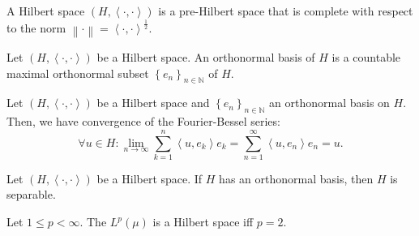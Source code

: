 \begin{frame}
	\begin{definition}
		A \alert{Hilbert space}
		\begin{math}
			\left(
			H,
			\left\langle\cdot,\cdot\right\rangle
			\right)
		\end{math}
		is a pre-Hilbert space that is complete with respect to the norm
		\begin{math}
			\left\|\cdot\right\|=
			{\left\langle\cdot,\cdot\right\rangle}^{\frac{1}{2}}
		\end{math}.
	\end{definition}

	\begin{definition}
		Let
		\begin{math}
			\left(
			H,
			\left\langle\cdot,\cdot\right\rangle
			\right)
		\end{math}
		be a Hilbert space.
		An \alert{orthonormal basis} of $H$
		is a countable maximal orthonormal subset
		\begin{math}
			{\left\{e_{n}\right\}}_{n\in\mathds{N}}
		\end{math}
		of $H$.
	\end{definition}

	\begin{theorem}
		Let
		\begin{math}
			\left(
			H,
			\left\langle\cdot,\cdot\right\rangle
			\right)
		\end{math}
		be a Hilbert space and $\left\{e_{n}\right\}_{n\in\mathds{N}}$
		an orthonormal basis on $H$.
		Then, we have convergence of the
		\alert{Fourier-Bessel series}:
		\begin{equation*}
			\forall u\in H:
			\lim\limits_{n\to\infty}
			\sum_{k=1}^{n}
			\left\langle u,e_{k}\right\rangle
			e_{k}=
			\sum_{n=1}^{\infty}
			\left\langle u,e_{n}\right\rangle
			e_{n}
			=u.
		\end{equation*}
	\end{theorem}

	\begin{theorem}
		Let
		\begin{math}
			\left(
			H,
			\left\langle\cdot,\cdot\right\rangle
			\right)
		\end{math}
		be a Hilbert space.
		If $H$ has an orthonormal basis, then $H$ is \alert{separable}.
	\end{theorem}

	\begin{theorem}
		Let $1\leq p<\infty$.
		The $L^{p}\left(\mu\right)$ is a Hilbert space iff $p=2$.
	\end{theorem}


\end{frame}
